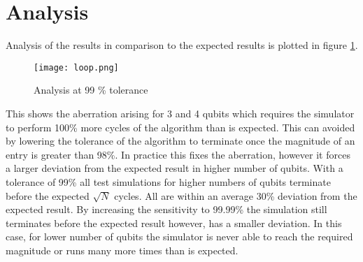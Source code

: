 \documentclass[12pt]{report}
\begin{document}
\section{Analysis}
Analysis of the results in comparison to the expected results is plotted in figure \ref{fig:loop}.
\begin{figure} [t]
\texttt{[image: loop.png]}
\caption{Analysis at 99 \% tolerance}
\label{fig:loop}
\end{figure} 
This shows the aberration arising for 3 and 4 qubits which requires the simulator to perform 100\% more cycles of the algorithm than is expected. This can avoided by lowering the tolerance of the algorithm to terminate once the magnitude of an entry is greater than 98\%. In practice this fixes the aberration, however it forces a larger deviation from the expected result in higher number of qubits. With a tolerance of 99\% all test simulations for higher numbers of qubits terminate before the expected $\sqrt{N}$ cycles. All are within an average 30\% deviation from the expected result. By increasing the sensitivity to 99.99\% the simulation still terminates before the expected result however, has a smaller deviation. In this case, for lower number of qubits the simulator is never able to reach the required magnitude or runs many more times than is expected. 
\end{document}
